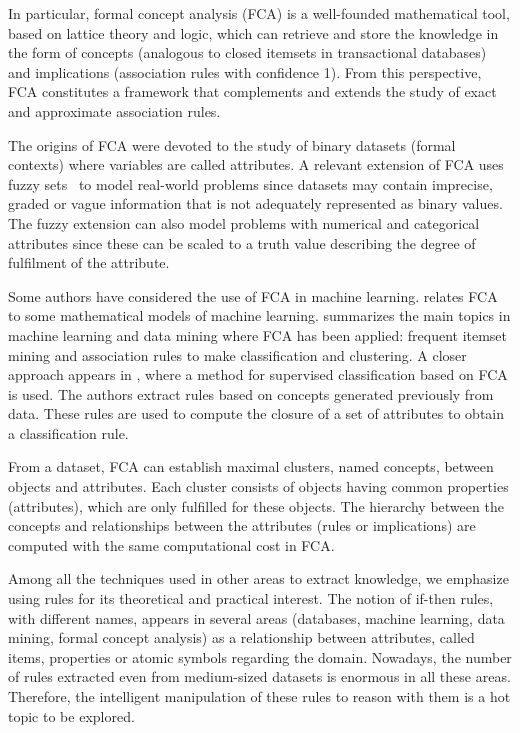 In particular, formal concept analysis (FCA)
\citep{wille1982restructuring, Ganter1999} is a well-founded
mathematical tool, based on lattice theory and logic, which can retrieve
and store the knowledge in the form of concepts (analogous to closed
itemsets in transactional databases) and implications (association rules
with confidence 1). From this perspective, FCA constitutes a framework
that complements and extends the study of exact and approximate
association rules.

The origins of FCA were devoted to the study of binary datasets (formal
contexts) where variables are called attributes. A relevant extension of
FCA uses fuzzy sets~\citep{BeVyAddgI, BeVyAddgII} to model
real-world problems since datasets may contain imprecise, graded or
vague information that is not adequately represented as binary values.
The fuzzy extension can also model problems with numerical and
categorical attributes since these can be scaled to a truth value
describing the degree of fulfilment of the attribute.

Some authors have considered the use of FCA in machine learning.
\citet{Kuznetsov04} relates FCA to some mathematical models of machine
learning. \citet{Ignatov2015} summarizes the main topics in machine
learning and data mining where FCA has been applied: frequent itemset
mining and association rules to make classification and clustering. A
closer approach appears in \citet{Trabelsi17}, where a method for
supervised classification based on FCA is used. The authors extract
rules based on concepts generated previously from data. These rules are
used to compute the closure of a set of attributes to obtain a
classification rule.

From a dataset, FCA can establish maximal clusters, named concepts,
between objects and attributes. Each cluster consists of objects having
common properties (attributes), which are only fulfilled for these
objects. The hierarchy between the concepts and relationships between
the attributes (rules or implications) are computed with the same
computational cost in FCA.

Among all the techniques used in other areas to extract knowledge, we
emphasize using rules for its theoretical and practical interest. The
notion of if-then rules, with different names, appears in several areas
(databases, machine learning, data mining, formal concept analysis) as a
relationship between attributes, called items, properties or atomic
symbols regarding the domain. Nowadays, the number of rules extracted
even from medium-sized datasets is enormous in all these areas.
Therefore, the intelligent manipulation of these rules to reason with
them is a hot topic to be explored.

